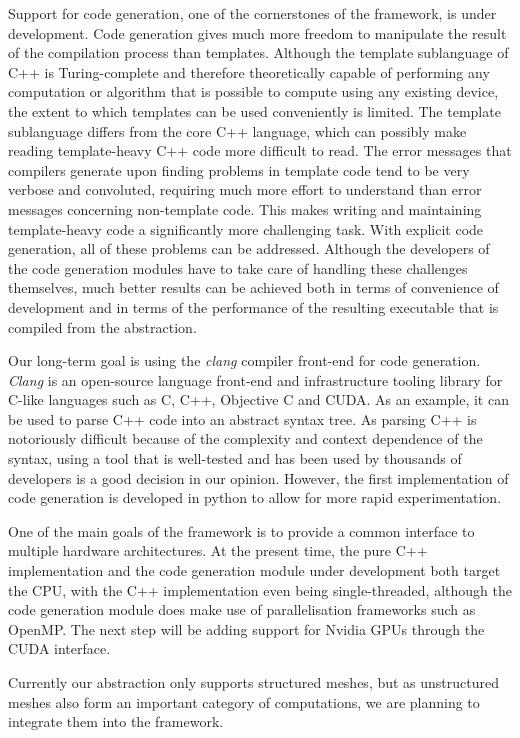 \documentclass[fontsize=11pt, appendixprefix=true]{scrreprt}
\begin{document}
Support for code generation, one of the cornerstones of the framework, is under
development. Code generation gives much more freedom to manipulate the result of
the compilation process than templates. Although the template sublanguage of C++
is Turing-complete and therefore theoretically capable of performing any
computation or algorithm that is possible to compute using any existing device,
the extent to which templates can be used conveniently is limited. The template
sublanguage differs from the core C++ language, which can possibly make reading
template-heavy C++ code more difficult to read. The error messages that
compilers generate upon finding problems in template code tend to be very
verbose and convoluted, requiring much more effort to understand than error
messages concerning non-template code. This makes writing and maintaining
template-heavy code a significantly more challenging task. With explicit code
generation, all of these problems can be addressed. Although the developers of
the code generation modules have to take care of handling these challenges
themselves, much better results can be achieved both in terms of convenience of
development and in terms of the performance of the resulting executable that is
compiled from the abstraction.

Our long-term goal is using the \textit{clang} compiler front-end for code
generation. \textit{Clang} is an open-source language front-end and
infrastructure tooling library for C-like languages such as C, C++, Objective C
and CUDA. As an example, it can be used to parse C++ code into an abstract
syntax tree. As parsing C++ is notoriously difficult because of the complexity
and context dependence of the syntax, using a tool that is well-tested and has
been used by thousands of developers is a good decision in our opinion. However,
the first implementation of code generation is developed in python to allow for
more rapid experimentation.

One of the main goals of the framework is to provide a common interface to
multiple hardware architectures. At the present time, the pure C++
implementation and the code generation module under development both target the
CPU, with the C++ implementation even being single-threaded, although the code
generation module does make use of parallelisation frameworks such as
OpenMP. The next step will be adding support for Nvidia GPUs through the CUDA
interface.

Currently our abstraction only supports structured meshes, but as unstructured
meshes also form an important category of computations, we are planning to
integrate them into the framework.
\end{document}
